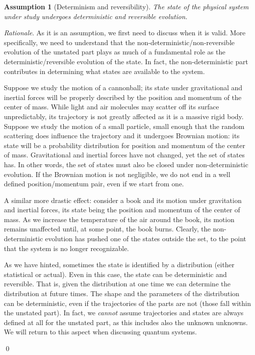 \documentclass[aps,pra,10pt,twocolumn,floatfix,nofootinbib]{revtex4-1}
\newtheorem{assump}{Assumption}
\theoremstyle{definition}
\newenvironment{rationale}{\emph{Rationale}.}{\qed}
\begin{document}
\begin{assump}[Determinism and reversibility]\label{detrevass}
The state of the physical system under study undergoes deterministic and reversible evolution.
\end{assump}

\begin{rationale}
As it is an assumption, we first need to discuss when it is valid. More specifically, we need to understand that the non-deterministic/non-reversible evolution of the unstated part plays as much of a fundamental role as the deterministic/reversible evolution of the state. In fact, the non-deterministic part contributes in determining what states are available to the system.

Suppose we study the motion of a cannonball; its state under gravitational and inertial forces will be properly described by the position and momentum of the center of mass. While light and air molecules may scatter off its surface unpredictably, its trajectory is not greatly affected as it is a massive rigid body. Suppose we study the motion of a small particle, small enough that the random scattering does influence the trajectory and it undergoes Brownian motion: its state will be a probability distribution for position and momentum of the center of mass. Gravitational and inertial forces have not changed, yet the set of states has. In other words, the set of states must also be closed under non-deterministic evolution. If the Brownian motion is not negligible, we do not end in a well defined position/momentum pair, even if we start from one.

A similar more drastic effect: consider a book and its motion under gravitation and inertial forces, its state being the position and momentum of the center of mass. As we increase the temperature of the air around the book, its motion remains unaffected until, at some point, the book burns. Clearly, the non-deterministic evolution has pushed one of the states outside the set, to the point that the system is no longer recognizable.

As we have hinted, sometimes the state is identified by a distribution (either statistical or actual). Even in this case, the state can be deterministic and reversible. That is, given the distribution at one time we can determine the distribution at future times. The shape and the parameters of the distribution can be deterministic, even if the trajectories of the parts are not (those fall within the unstated part). In fact, we \emph{cannot} assume trajectories and states are always defined at all for the unstated part, as this includes also the unknown unknowns. We will return to this aspect when discussing quantum systems.


\end{rationale}
\end{document}
